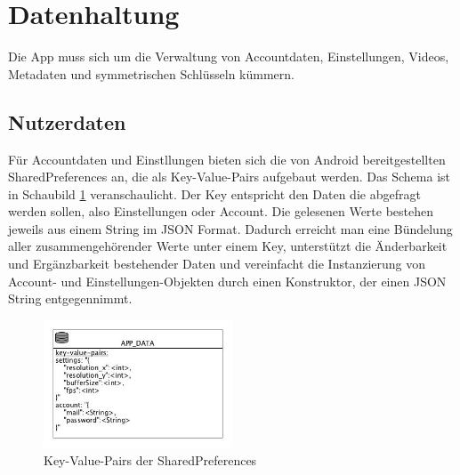 \section{Datenhaltung}
Die App muss sich um die Verwaltung von Accountdaten, Einstellungen, Videos, Metadaten und symmetrischen Schlüsseln kümmern. 

\subsection{Nutzerdaten}
Für Accountdaten und  Einstllungen bieten sich die von Android bereitgestellten SharedPreferences an, die als Key-Value-Pairs aufgebaut werden. Das Schema ist in Schaubild \ref{fig:sharedpreferences_overview} veranschaulicht. Der Key entspricht den Daten die abgefragt werden sollen, also Einstellungen oder Account. Die gelesenen Werte bestehen jeweils aus einem String im JSON Format. Dadurch erreicht man eine Bündelung aller zusammengehörender Werte unter einem Key, unterstützt die Änderbarkeit und Ergänzbarkeit bestehender Daten und vereinfacht die Instanzierung von Account- und Einstellungen-Objekten durch einen Konstruktor, der einen JSON String entgegennimmt.\newline\par


\begin{figure}[ht]
	\centering
\includegraphics[width=0.5\textwidth]{./resources/Diagramme/App/sharedpreferences_overview.jpg}
\caption{Key-Value-Pairs der SharedPreferences}
	\label{fig:sharedpreferences_overview}
\end{figure}

